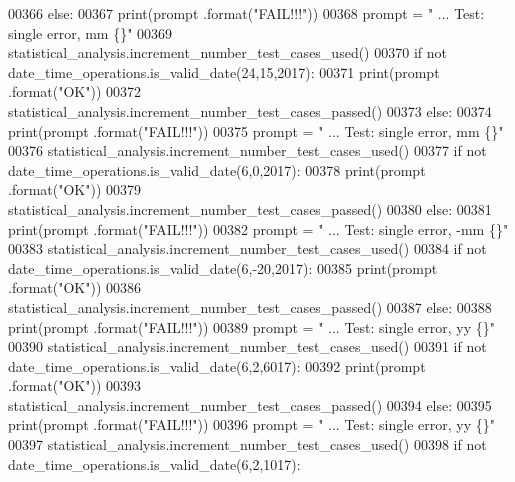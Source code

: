 \begin{DoxyCode}
00366         \textcolor{keywordflow}{else}:
00367             print(prompt .format(\textcolor{stringliteral}{"FAIL!!!"}))
00368         prompt = \textcolor{stringliteral}{"  ... Test: single error, mm              \{\}"}
00369         statistical\_analysis.increment\_number\_test\_cases\_used()
00370         \textcolor{keywordflow}{if} \textcolor{keywordflow}{not} date\_time\_operations.is\_valid\_date(24,15,2017):
00371             print(prompt .format(\textcolor{stringliteral}{"OK"}))
00372             statistical\_analysis.increment\_number\_test\_cases\_passed()
00373         \textcolor{keywordflow}{else}:
00374             print(prompt .format(\textcolor{stringliteral}{"FAIL!!!"}))
00375         prompt = \textcolor{stringliteral}{"  ... Test: single error, mm              \{\}"}
00376         statistical\_analysis.increment\_number\_test\_cases\_used()
00377         \textcolor{keywordflow}{if} \textcolor{keywordflow}{not} date\_time\_operations.is\_valid\_date(6,0,2017):
00378             print(prompt .format(\textcolor{stringliteral}{"OK"}))
00379             statistical\_analysis.increment\_number\_test\_cases\_passed()
00380         \textcolor{keywordflow}{else}:
00381             print(prompt .format(\textcolor{stringliteral}{"FAIL!!!"}))
00382         prompt = \textcolor{stringliteral}{"  ... Test: single error, -mm             \{\}"}
00383         statistical\_analysis.increment\_number\_test\_cases\_used()
00384         \textcolor{keywordflow}{if} \textcolor{keywordflow}{not} date\_time\_operations.is\_valid\_date(6,-20,2017):
00385             print(prompt .format(\textcolor{stringliteral}{"OK"}))
00386             statistical\_analysis.increment\_number\_test\_cases\_passed()
00387         \textcolor{keywordflow}{else}:
00388             print(prompt .format(\textcolor{stringliteral}{"FAIL!!!"}))
00389         prompt = \textcolor{stringliteral}{"  ... Test: single error, yy              \{\}"}
00390         statistical\_analysis.increment\_number\_test\_cases\_used()
00391         \textcolor{keywordflow}{if} \textcolor{keywordflow}{not} date\_time\_operations.is\_valid\_date(6,2,6017):
00392             print(prompt .format(\textcolor{stringliteral}{"OK"}))
00393             statistical\_analysis.increment\_number\_test\_cases\_passed()
00394         \textcolor{keywordflow}{else}:
00395             print(prompt .format(\textcolor{stringliteral}{"FAIL!!!"}))
00396         prompt = \textcolor{stringliteral}{"  ... Test: single error, yy              \{\}"}
00397         statistical\_analysis.increment\_number\_test\_cases\_used()
00398         \textcolor{keywordflow}{if} \textcolor{keywordflow}{not} date\_time\_operations.is\_valid\_date(6,2,1017):

\end{DoxyCode}
